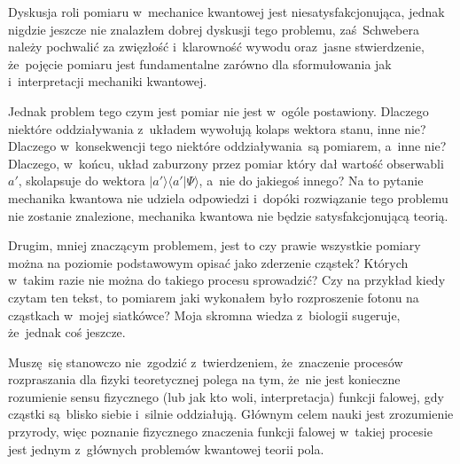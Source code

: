 \documentclass[a4paper,11pt]{article}
\begin{document}
\vspace{\spaceTwo}














\start {} Dyskusja roli pomiaru w~mechanice kwantowej jest
niesatysfakcjonująca, jednak nigdzie jeszcze nie znalazłem dobrej
dyskusji tego problemu, zaś~Schwebera należy pochwalić za zwięzłość
i~klarowność wywodu oraz~jasne stwierdzenie, że~pojęcie pomiaru jest
fundamentalne zarówno dla sformułowania jak i~interpretacji mechaniki
kwantowej.

Jednak problem tego czym jest pomiar nie jest w~ogóle postawiony.
Dlaczego niektóre oddziaływania z~układem wywołują kolaps wektora
stanu, inne nie? Dlaczego w~konsekwencji tego niektóre
oddziaływania~są pomiarem, a~inne nie? Dlaczego, w~końcu, układ
zaburzony przez pomiar który dał wartość obserwabli $a'$, skolapsuje
do wektora $| a' \rangle \langle a' | \Psi \rangle$, a~nie do jakiegoś
innego? Na to pytanie mechanika kwantowa nie udziela odpowiedzi
i~dopóki rozwiązanie tego problemu nie zostanie znalezione, mechanika
kwantowa nie będzie satysfakcjonującą teorią.

Drugim, mniej znaczącym problemem, jest to czy prawie wszystkie
pomiary można na poziomie podstawowym opisać jako zderzenie cząstek?
Których w~takim razie nie można do takiego procesu sprowadzić? Czy na
przykład kiedy czytam ten tekst, to pomiarem jaki wykonałem było
rozproszenie fotonu na cząstkach w~mojej siatkówce? Moja skromna
wiedza z~biologii sugeruje, że~jednak coś jeszcze.

\vspace{\spaceFour}



\start {} Muszę~się stanowczo nie~zgodzić z~twierdzeniem,
że~znaczenie procesów rozpraszania dla fizyki teoretycznej polega na
tym, że~nie jest konieczne rozumienie sensu fizycznego (lub jak kto
woli, interpretacja) funkcji falowej, gdy cząstki są~blisko siebie
i~silnie oddziałują. Głównym celem nauki jest zrozumienie przyrody,
więc poznanie fizycznego znaczenia funkcji falowej w~takiej procesie
jest jednym z~głównych problemów kwantowej teorii pola.
\end{document}
